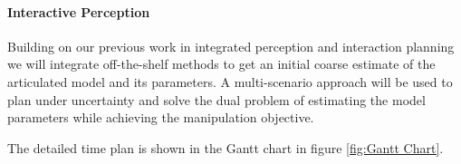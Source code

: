 \paragraph{Interactive Perception} Building on our previous work in integrated perception and interaction planning we will integrate off-the-shelf methods to get an initial coarse estimate of the articulated model and its parameters. A multi-scenario approach will be used to plan under uncertainty and solve the dual problem of estimating the model parameters while achieving the manipulation objective.  

\medskip
The detailed time plan is shown in the Gantt chart in figure \ref{fig:Gantt Chart}.



\FloatBarrier